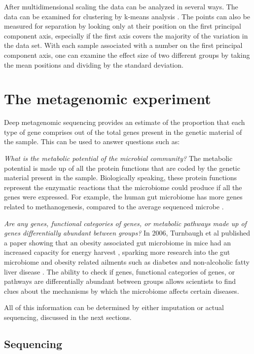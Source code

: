After multidimensional scaling the data can be analyzed in several ways. The data can be examined for clustering by k-means analysis \cite{tibshirani2005cluster}. The points can also be measured for separation by looking only at their position on the first principal component axis, especially if the first axis covers the majority of the variation in the data set. With each sample associated with a number on the first principal component axis, one can examine the effect size of two different groups by taking the mean positions and dividing by the standard deviation.

\section{The metagenomic experiment}
Deep metagenomic sequencing provides an estimate of the proportion that each type of gene comprises out of the total genes present in the genetic material of the sample. This can be used to answer questions such as:

\textit{What is the metabolic potential of the microbial community?}
The metabolic potential is made up of all the protein functions that are coded by the genetic material present in the sample. Biologically speaking, these protein functions represent the enzymatic reactions that the microbiome could produce if all the genes were expressed. For example, the human gut microbiome has more genes related to methanogenesis, compared to the average sequenced microbe \cite{gill2006metagenomic}.

\textit{Are any genes, functional categories of genes, or metabolic pathways made up of genes differentially abundant between groups?}
In 2006, Turnbaugh et al published a paper showing that an obesity associated gut microbiome in mice had an increased capacity for energy harvest \cite{turnbaugh2006obesity}, sparking more research into the gut microbiome and obesity related ailments such as diabetes \cite{larsen2010gut} and non-alcoholic fatty liver disease \cite{zhu2013characterization}. The ability to check if genes, functional categories of genes, or pathways are differentially abundant between groups allows scientists to find clues about the mechanisms by which the microbiome affects certain diseases.

All of this information can be determined by either imputation or actual sequencing, discussed in the next sections.

\subsection{Sequencing}

